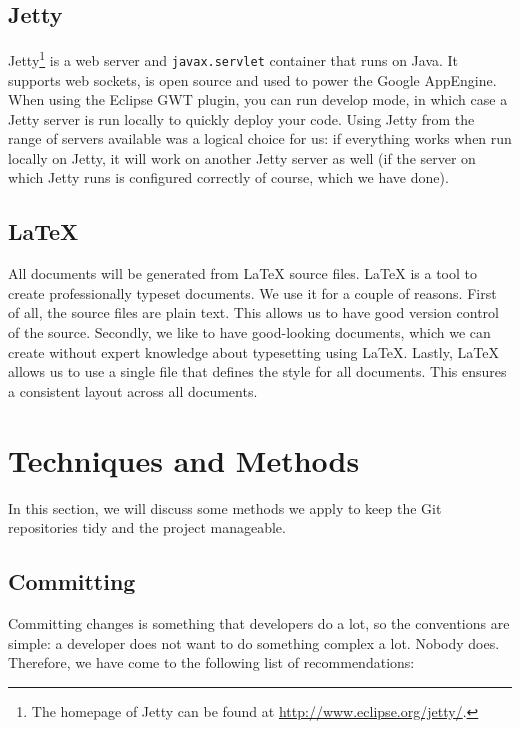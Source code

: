 \subsection{Jetty}
\label{subsec:tools-jetty}
Jetty\footnote{The homepage of Jetty can be found at \url{http://www.eclipse.org/jetty/}.} is a web server and \texttt{javax.servlet} container that runs on Java. It supports web sockets, is open source and used to power the Google AppEngine. When using the Eclipse GWT plugin, you can run develop mode, in which case a Jetty server is run locally to quickly deploy your code. Using Jetty from the range of servers available was a logical choice for us: if everything works when run locally on Jetty, it will work on another Jetty server as well (if the server on which Jetty runs is configured correctly of course, which we have done).

\subsection{\LaTeX{}}
\label{subsec:tools-latex}
All documents will be generated from \LaTeX{} source files. \LaTeX{} is a tool to create professionally typeset documents. We use it for a couple of reasons. First of all, the source files are plain text. This allows us to have good version control of the source. Secondly, we like to have good-looking documents, which we can create without expert knowledge about typesetting using \LaTeX{}. Lastly, \LaTeX{} allows us to use a single file that defines the style for all documents. This ensures a consistent layout across all documents.

\section{Techniques and Methods}
In this section, we will discuss some methods we apply to keep the Git repositories tidy and the project manageable.

\subsection{Committing}
Committing changes is something that developers do a lot, so the conventions are simple: a developer does not want to do something complex a lot. Nobody does. Therefore, we have come to the following list of recommendations:

